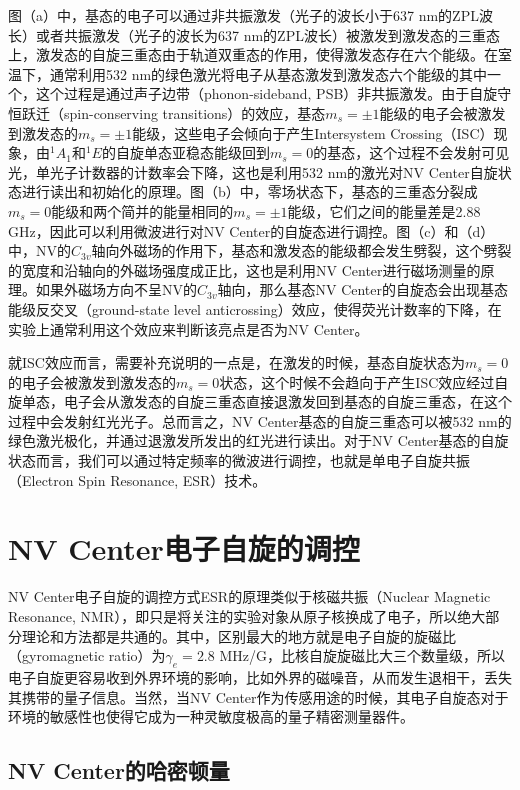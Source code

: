 \documentclass[type = bachelor, oneside]{whu-thesis}
\begin{document}
图（a）中，基态的电子可以通过非共振激发（光子的波长小于637 nm的ZPL波长）或者共振激发（光子的波长为637 nm的ZPL波长）被激发到激发态的三重态上，激发态的自旋三重态由于轨道双重态的作用，使得激发态存在六个能级。在室温下，通常利用532 nm的绿色激光将电子从基态激发到激发态六个能级的其中一个，这个过程是通过声子边带（phonon-sideband, PSB）非共振激发。由于自旋守恒跃迁（spin-conserving transitions）的效应，基态$m_s=\pm 1$能级的电子会被激发到激发态的$m_s=\pm 1$能级，这些电子会倾向于产生Intersystem Crossing（ISC）现象，由$^1A_1$和$^1E$的自旋单态亚稳态能级回到$m_s=0$的基态，这个过程不会发射可见光，单光子计数器的计数率会下降，这也是利用532 nm的激光对NV Center自旋状态进行读出和初始化的原理。图（b）中，零场状态下，基态的三重态分裂成$m_s = 0$能级和两个简并的能量相同的$m_s=\pm 1$能级，它们之间的能量差是2.88 GHz，因此可以利用微波进行对NV Center的自旋态进行调控。图（c）和（d）中，NV的$C_{3v}$轴向外磁场的作用下，基态和激发态的能级都会发生劈裂，这个劈裂的宽度和沿轴向的外磁场强度成正比，这也是利用NV Center进行磁场测量的原理。如果外磁场方向不呈NV的$C_{3v}$轴向，那么基态NV Center的自旋态会出现基态能级反交叉（ground-state level anticrossing）效应，使得荧光计数率的下降，在实验上通常利用这个效应来判断该亮点是否为NV Center。

就ISC效应而言，需要补充说明的一点是，在激发的时候，基态自旋状态为$m_s = 0$的电子会被激发到激发态的$m_s = 0$状态，这个时候不会趋向于产生ISC效应经过自旋单态，电子会从激发态的自旋三重态直接退激发回到基态的自旋三重态，在这个过程中会发射红光光子。总而言之，NV Center基态的自旋三重态可以被532 nm的绿色激光极化，并通过退激发所发出的红光进行读出。对于NV Center基态的自旋状态而言，我们可以通过特定频率的微波进行调控，也就是单电子自旋共振（Electron Spin Resonance, ESR）技术。

\section{NV Center电子自旋的调控}

NV Center电子自旋的调控方式ESR的原理类似于核磁共振（Nuclear Magnetic Resonance, NMR），即只是将关注的实验对象从原子核换成了电子，所以绝大部分理论和方法都是共通的。其中，区别最大的地方就是电子自旋的旋磁比（gyromagnetic ratio）为$\gamma_e=2.8$ MHz/G，比核自旋旋磁比大三个数量级，所以电子自旋更容易收到外界环境的影响，比如外界的磁噪音，从而发生退相干，丢失其携带的量子信息。当然，当NV Center作为传感用途的时候，其电子自旋态对于环境的敏感性也使得它成为一种灵敏度极高的量子精密测量器件。

\subsection{NV Center的哈密顿量}
\end{document}
